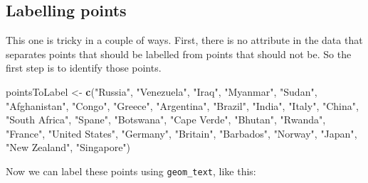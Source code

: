 \documentclass[]{book}
\newenvironment{Shaded}{\begin{snugshade}}{\end{snugshade}}
\newcommand{\KeywordTok}[1]{\textcolor[rgb]{0.13,0.29,0.53}{\textbf{#1}}}
\newcommand{\DataTypeTok}[1]{\textcolor[rgb]{0.13,0.29,0.53}{#1}}
\newcommand{\StringTok}[1]{\textcolor[rgb]{0.31,0.60,0.02}{#1}}
\newcommand{\OperatorTok}[1]{\textcolor[rgb]{0.81,0.36,0.00}{\textbf{#1}}}
\newcommand{\NormalTok}[1]{#1}
\begin{document}
\subsection{Labelling points}\label{labelling-points}

This one is tricky in a couple of ways. First, there is no attribute in
the data that separates points that should be labelled from points that
should not be. So the first step is to identify those points.

\begin{Shaded}
\begin{Highlighting}[]
\NormalTok{pointsToLabel <-}\StringTok{ }\KeywordTok{c}\NormalTok{(}\StringTok{"Russia"}\NormalTok{, }\StringTok{"Venezuela"}\NormalTok{, }\StringTok{"Iraq"}\NormalTok{, }\StringTok{"Myanmar"}\NormalTok{, }\StringTok{"Sudan"}\NormalTok{,}
                   \StringTok{"Afghanistan"}\NormalTok{, }\StringTok{"Congo"}\NormalTok{, }\StringTok{"Greece"}\NormalTok{, }\StringTok{"Argentina"}\NormalTok{, }\StringTok{"Brazil"}\NormalTok{,}
                   \StringTok{"India"}\NormalTok{, }\StringTok{"Italy"}\NormalTok{, }\StringTok{"China"}\NormalTok{, }\StringTok{"South Africa"}\NormalTok{, }\StringTok{"Spane"}\NormalTok{,}
                   \StringTok{"Botswana"}\NormalTok{, }\StringTok{"Cape Verde"}\NormalTok{, }\StringTok{"Bhutan"}\NormalTok{, }\StringTok{"Rwanda"}\NormalTok{, }\StringTok{"France"}\NormalTok{,}
                   \StringTok{"United States"}\NormalTok{, }\StringTok{"Germany"}\NormalTok{, }\StringTok{"Britain"}\NormalTok{, }\StringTok{"Barbados"}\NormalTok{, }\StringTok{"Norway"}\NormalTok{, }\StringTok{"Japan"}\NormalTok{,}
                   \StringTok{"New Zealand"}\NormalTok{, }\StringTok{"Singapore"}\NormalTok{)}
\end{Highlighting}
\end{Shaded}

Now we can label these points using \texttt{geom\_text}, like this:

\begin{Shaded}
\end{Shaded}
\end{document}
